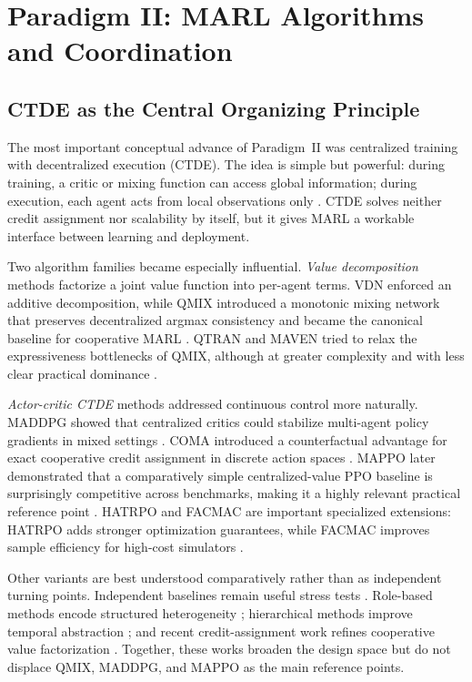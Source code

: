 \documentclass[12pt, a4paper]{article}
\begin{document}
\section{Paradigm II: MARL Algorithms and Coordination}
\label{sec:paradigm2}

\subsection{CTDE as the Central Organizing Principle}

The most important conceptual advance of Paradigm~II was centralized training
with decentralized execution (CTDE). The idea is simple but powerful: during
training, a critic or mixing function can access global information; during
execution, each agent acts from local observations only \cite{kraemer2016multi,lowe2017multi}. CTDE solves neither credit assignment nor scalability by itself,
but it gives MARL a workable interface between learning and deployment.

Two algorithm families became especially influential. \emph{Value decomposition}
methods factorize a joint value function into per-agent terms. VDN enforced an
additive decomposition, while QMIX introduced a monotonic mixing network that
preserves decentralized argmax consistency and became the canonical baseline for
cooperative MARL \cite{sunehag2018value,rashid2018qmix}. QTRAN and MAVEN tried
to relax the expressiveness bottlenecks of QMIX, although at greater complexity
and with less clear practical dominance \cite{son2019qtran,mahajan2019maven}.

\emph{Actor-critic CTDE} methods addressed continuous control more naturally.
MADDPG showed that centralized critics could stabilize multi-agent policy
gradients in mixed settings \cite{lowe2017multi}. COMA introduced a
counterfactual advantage for exact cooperative credit assignment in discrete
action spaces \cite{foerster2018counterfactual}. MAPPO later demonstrated that a
comparatively simple centralized-value PPO baseline is surprisingly competitive
across benchmarks, making it a highly relevant practical reference point
\cite{yu2021surprising}. HATRPO and FACMAC are important specialized extensions:
HATRPO adds stronger optimization guarantees, while FACMAC improves sample
efficiency for high-cost simulators \cite{kuba2021hatrpo,peng2021facmac}.

Other variants are best understood comparatively rather than as independent
turning points. Independent baselines remain useful stress tests
\cite{tan1993multi,de2020independent}. Role-based methods encode structured
heterogeneity \cite{wang2021rode,wang2020roma}; hierarchical methods improve
temporal abstraction \cite{vezhnevets2017feudal,chu2020multi}; and recent
credit-assignment work refines cooperative value factorization
\cite{wang2020shapley,su2021vdac}. Together, these works broaden the design
space but do not displace QMIX, MADDPG, and MAPPO as the main reference points.
\end{document}
